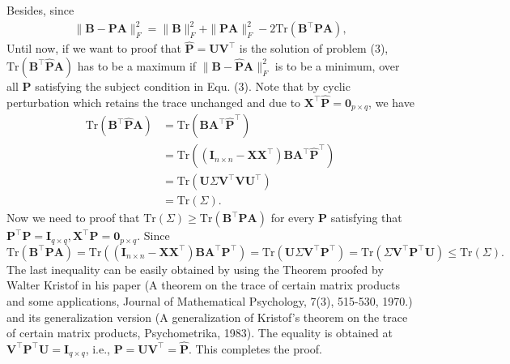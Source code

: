 \documentclass[titlepage,11pt,twoside]{article}
\begin{document}
Besides, since
\begin{equation}
\begin{split}
\|\mathbf{B}-\mathbf{P}\mathbf{A}\|_{F}^{2}
=\|\mathbf{B}\|_{F}^{2}+\|\mathbf{P}\mathbf{A}\|_{F}^{2}-2\text{Tr}(\mathbf{B}^{\top}\mathbf{P}\mathbf{A}),
\end{split}
\end{equation}
Until now, if we want to proof that $\mathbf{\hat{P}}=\mathbf{U}\mathbf{V}^{\top}$ is the solution of problem (3), $\text{Tr}(\mathbf{B}^{\top}\mathbf{\hat{P}}\mathbf{A})$ has to be a maximum if $\|\mathbf{B}-\mathbf{\hat{P}}\mathbf{A}\|_{F}^{2}$ is to be a minimum, over all $\mathbf{P}$ satisfying the subject condition in Equ. (3).
Note that by cyclic perturbation which retains the trace unchanged and due to $\mathbf{X}^{\top}\mathbf{\hat{P}}=\mathbf{0}_{p\times q}$, we have 
\begin{equation}
\begin{split}
\text{Tr}(\mathbf{B}^{\top}\mathbf{\hat{P}}\mathbf{A})
&
=
\text{Tr}(\mathbf{B}\mathbf{A}^{\top}\mathbf{\hat{P}}^{\top})
\\
&
=
\text{Tr}((\mathbf{I}_{n\times n}-\mathbf{X}\mathbf{X}^{\top})\mathbf{B}\mathbf{A}^{\top}\mathbf{\hat{P}}^{\top})
\\
&
=
\text{Tr}(\mathbf{U}\Sigma\mathbf{V}^{\top}\mathbf{V}\mathbf{U}^{\top})
\\
&
=
\text{Tr}(\Sigma).
\end{split}
\end{equation}
Now we need to proof that $\text{Tr}(\Sigma)\ge\text{Tr}(\mathbf{B}^{\top}\mathbf{P}\mathbf{A})$ for every $\mathbf{P}$ satisfying that $\mathbf{P}^{\top}\mathbf{P} = \mathbf{I}_{q\times q}, \mathbf{X}^{\top}\mathbf{P} = \mathbf{0}_{p\times q}$. 
Since $\text{Tr}(\mathbf{B}^{\top}\mathbf{P}\mathbf{A})
=
\text{Tr}((\mathbf{I}_{n\times n}-\mathbf{X}\mathbf{X}^{\top})\mathbf{B}\mathbf{A}^{\top}\mathbf{P}^{\top})
=
\text{Tr}(\mathbf{U}\Sigma\mathbf{V}^{\top}\mathbf{P}^{\top})
=
\text{Tr}(\Sigma\mathbf{V}^{\top}\mathbf{P}^{\top}\mathbf{U})
\le
\text{Tr}(\Sigma)
.
$
The last inequality can be easily obtained by using the Theorem proofed by Walter Kristof in his paper (A theorem on the trace of certain matrix products and some applications, Journal of Mathematical Psychology, 7(3), 515-530, 1970.) and its generalization version (A generalization of Kristof's theorem on the trace of certain matrix products, Psychometrika, 1983). The equality is obtained at 
$\mathbf{V}^{\top}\mathbf{P}^{\top}\mathbf{U}=\mathbf{I}_{q\times q}$, i.e., $\mathbf{P}=\mathbf{U}\mathbf{V}^{\top}=\mathbf{\hat{P}}$. This completes the proof.
\end{document}
